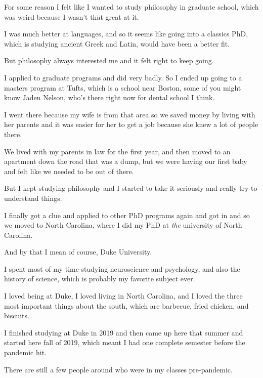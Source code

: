 \begin{compactitem}
\begin{compactitem}
\begin{compactitem}
						\end{compactitem}
					\item For some reason I felt like I wanted to study philosophy in graduate school, which was weird because I wasn't that great at it.
						\begin{compactitem}
							\item I was much better at languages, and so it seems like going into a classics PhD, which is studying ancient Greek and Latin, would have been a better fit.
							\item But philosophy always interested me and it felt right to keep going.
						\end{compactitem}
					\item I applied to graduate programs and did very badly. So I ended up going to a masters program at Tufts, which is a school near Boston, some of you might know Jaden Nelson, who's there right now for dental school I think.
					\item I went there because my wife is from that area so we saved money by living with her parents and it was easier for her to get a job because she knew a lot of people there.
					\item We lived with my parents in law for the first year, and then moved to an apartment down the road that was a dump, but we were having our first baby and felt like we needed to be out of there.
					\item But I kept studying philosophy and I started to take it seriously and really try to understand things.
					\item I finally got a clue and applied to other PhD programs again and got in and so we moved to North Carolina, where I did my PhD at \textit{the} university of North Carolina.
					\item And by that I mean of course, Duke University.
					\item I spent most of my time studying neuroscience and psychology, and also the history of science, which is probably my favorite subject ever.
					\item I loved being at Duke, I loved living in North Carolina, and I loved the three most important things about the south, which are barbecue, fried chicken, and biscuits.
					\item I finished studying at Duke in 2019 and then came up here that summer and started here fall of 2019, which meant I had one complete semester before the pandemic hit.
					\item There are still a few people around who were in my classes pre-pandemic.
				\end{compactitem}
				

\end{compactitem}
